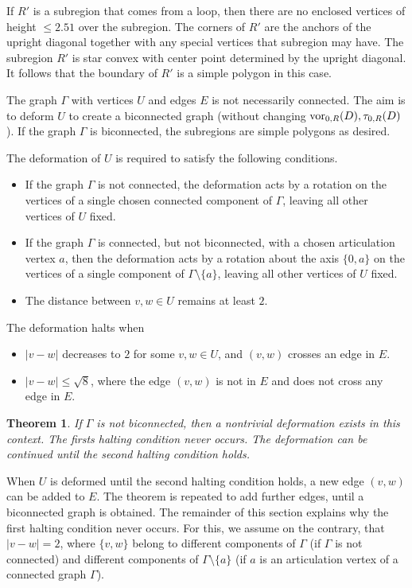\documentclass[11pt]{amsart}
\def\op#1{{\text{#1}}}
\def\text{\hbox}
\newtheorem{thm}[subsubsection]{Theorem}
\begin{document}
If $R'$ is a subregion that comes from a loop, then there are no enclosed vertices of height $\le 2.51$ over the
subregion.  The corners of $R'$ are the anchors of the upright diagonal together with any special vertices
that subregion may have.  The subregion $R'$ is star convex with center point determined by the upright diagonal.
It follows that the boundary of $R'$ is a simple polygon in this case.

The graph $\Gamma$ with vertices $U$ and edges $E$ is not necessarily connected.  The aim is to deform
$U$ to create a biconnected graph (without changing $\op{vor}_{0,R}(D),\tau_{0,R}(D)$).  If the graph $\Gamma$
is biconnected, the subregions are simple polygons as desired.

The deformation of $U$ is required to satisfy the following conditions.
\begin{itemize}
\item If the graph $\Gamma$ is not connected,
the deformation acts by a rotation on the vertices of a single chosen connected component of $\Gamma$,
leaving all other vertices of $U$ fixed.
\item If the graph $\Gamma$ is connected, but not biconnected, with a chosen articulation vertex $a$, then
the deformation acts by a rotation about the axis $\{0,a\}$ on the vertices of a single component of $\Gamma\setminus\{a\}$,
leaving all other vertices of $U$ fixed.
\item The distance between $v,w\in U$ remains at least $2$.
\end{itemize}

The deformation halts when 
\begin{itemize}
\item $|v-w|$ decreases to $2$ for some $v,w\in U$, and $(v,w)$ crosses an edge in $E$.
\item $|v-w|\le\sqrt8$, where the edge $(v,w)$ is not in $E$ and does not cross any edge in $E$.
\end{itemize}

\begin{thm}  If $\Gamma$ is not biconnected, then a nontrivial deformation exists in this context. 
The firsts halting condition never occurs.  The deformation can be continued until the second halting
condition holds.
\end{thm}

When $U$ is deformed until the second halting condition holds, a new edge $(v,w)$ can be added to $E$.
The theorem is repeated to add further edges, until a biconnected graph is obtained.  
The remainder of this section explains why the first halting condition never occurs.  For
this, we assume on the contrary, that $|v-w|=2$, where $\{v,w\}$ belong to different components
of $\Gamma$ (if $\Gamma$ is not connected) and different components of $\Gamma\setminus\{a\}$ (if $a$
is an articulation vertex of a connected graph $\Gamma$). 
\end{document}
